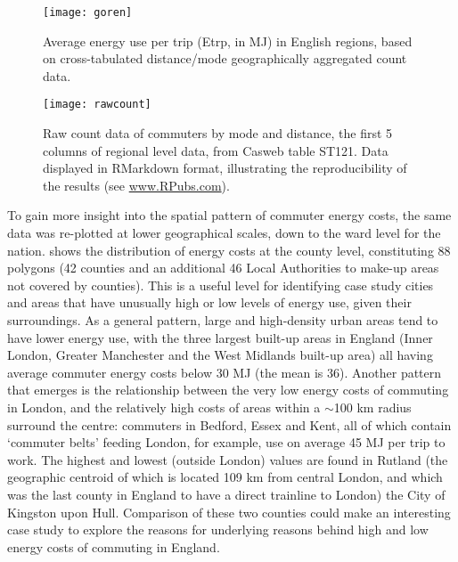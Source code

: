 \begin{figure}[htbp]
\begin{center}
    \texttt{[image: goren]}  \end{center}
  \caption[Average energy use per trip (Etrp, in MJ) in English regions]
  {Average energy use per trip (Etrp, in MJ) in English regions, based
  on cross-tabulated distance/mode geographically aggregated count data.}
 \label{fgoren}
\end{figure}

\begin{figure}[htbp]
\begin{center}
    \texttt{[image: rawcount]}  \end{center}
  \caption[Raw count data of commuters by mode and distance.]
  {Raw count data of commuters by mode and distance, the first 5 columns of
  regional level data, from Casweb table ST121. Data displayed in RMarkdown
  format, illustrating the reproducibility of the results (see
  \href{http://rpubs.com/robinlovelace}{www.RPubs.com}).}
 \label{frcount}
\end{figure}

To gain more insight into the spatial pattern of commuter energy costs,
the same data was re-plotted at lower geographical scales, down to the ward
level for the nation.  shows the distribution of energy costs
at the county level, constituting 88 polygons (42 counties and an additional 46
Local Authorities to make-up areas not covered by counties). This is a useful
level for identifying case study cities and areas that have unusually high
or low levels of energy use, given their surroundings. As a general pattern,
large and high-density urban areas tend to have lower energy use, with
the three largest built-up areas in England (Inner London, Greater Manchester
and the West Midlands built-up area) all having average commuter energy costs
below 30 MJ (the mean is 36). Another pattern that emerges is the relationship
between the very low energy costs of commuting in London, and the relatively high
costs of areas within a $\sim$100 km radius surround the centre: commuters in Bedford, Essex and
Kent, all of which contain `commuter belts' feeding London, for example, use
on average 45 MJ per trip to work. The highest and lowest (outside London)
values are found in Rutland (the geographic centroid of which is located 109
km from central London, and which was the last county in England to have
a direct trainline to London) the City of Kingston upon Hull.
Comparison of these two counties could make an interesting case study
to explore the reasons for underlying reasons behind high and low
energy costs of commuting in England.

